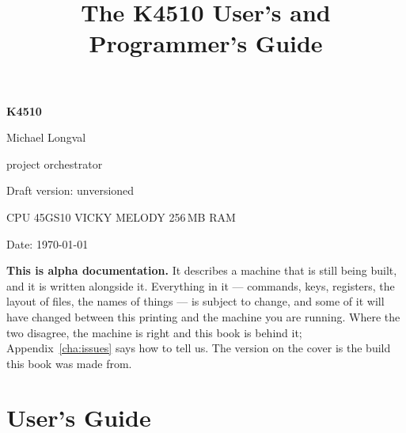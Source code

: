 \documentclass[a5paper,11pt,openany]{book}
\title{The K4510 User's and Programmer's Guide}
\author{}\date{}
\newcommand{\guideversion}{unversioned}
\newcommand{\guidedate}{\today}
\begin{document}
\begin{titlepage}
\pagecolor{kblue}\color{kwhite}
\vspace*{2cm}\raggedleft
{\fontsize{40}{44}\selectfont\bfseries K4510\par}
\vspace{4mm}{\color{kyellow}\rule{\linewidth}{1.4pt}}
\vspace{6mm}{\Large USER'S AND PROGRAMMER'S GUIDE\par}
\vfill
{\normalsize Michael Longval\par}
{\small\color{kyellow} project orchestrator\par}
\vspace{6mm}
{\small\color{kyellow}
Draft version: \guideversion{}\par
\vspace{1mm}
CPU 45GS10 \textperiodcentered{} VICKY
\textperiodcentered{} MELODY \textperiodcentered{} 256\,MB RAM\par
\vspace{2mm}
Date: \guidedate\par}
\end{titlepage}
\nopagecolor
\thispagestyle{empty}
\vspace*{\fill}
\begin{aside}
\textbf{This is alpha documentation.} It describes a machine that is
still being built, and it is written alongside it. Everything in it ---
commands, keys, registers, the layout of files, the names of things ---
is subject to change, and some of it will have changed between this
printing and the machine you are running. Where the two disagree, the
machine is right and this book is behind it; Appendix~\ref{cha:issues}
says how to tell us. The version on the cover is the build this book
was made from.
\end{aside}
\vspace*{\fill}
\clearpage
\frontmatter
\tableofcontents
\mainmatter
\part{User's Guide}
\end{document}
